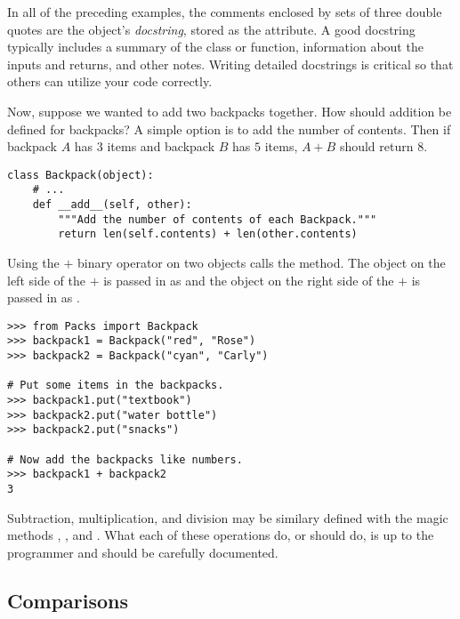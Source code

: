 \begin{info}
In all of the preceding examples, the comments enclosed by sets of three double quotes are the object's \emph{docstring}, stored as the  attribute.
A good docstring typically includes a summary of the class or function, information about the inputs and returns, and other notes.
Writing detailed docstrings is critical so that others can utilize your code correctly.
\end{info}

Now, suppose we wanted to add two backpacks together.
How should addition be defined for backpacks?
A simple option is to add the number of contents.
Then if backpack $A$ has $3$ items and backpack $B$ has $5$ items, $A + B$ should return $8$.

\begin{lstlisting}
class Backpack(object):
    # ...
    def __add__(self, other):
        """Add the number of contents of each Backpack."""
        return len(self.contents) + len(other.contents)
\end{lstlisting}

Using the $+$ binary operator on two  objects calls the  method.
The object on the left side of the $+$ is passed in as  and the object on the right side of the $+$ is passed in as .

\begin{lstlisting}
>>> from Packs import Backpack
>>> backpack1 = Backpack("red", "Rose")
>>> backpack2 = Backpack("cyan", "Carly")

# Put some items in the backpacks.
>>> backpack1.put("textbook")
>>> backpack2.put("water bottle")
>>> backpack2.put("snacks")

# Now add the backpacks like numbers.
>>> backpack1 + backpack2
3
\end{lstlisting}

Subtraction, multiplication, and division may be similary defined with the magic methods , , and .
What each of these operations do, or should do, is up to the programmer and should be carefully documented.

\subsection*{Comparisons}

